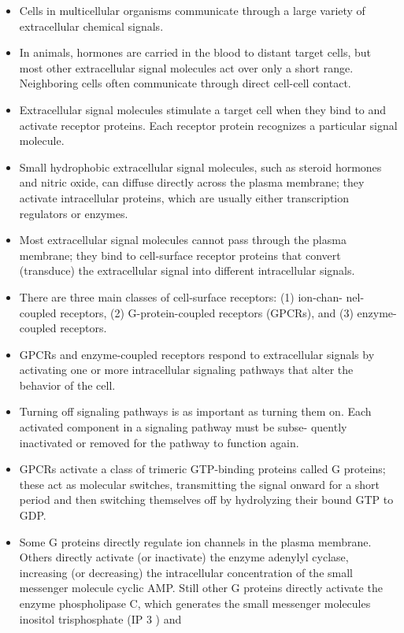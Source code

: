 \begin{itemize}
\item Cells in multicellular organisms communicate through a large variety
of extracellular chemical signals.
\item In animals, hormones are carried in the blood to distant target cells,
but most other extracellular signal molecules act over only a short
range. Neighboring cells often communicate through direct cell-cell
contact.
\item Extracellular signal molecules stimulate a target cell when they bind
to and activate receptor proteins. Each receptor protein recognizes a
particular signal molecule.
\item Small hydrophobic extracellular signal molecules, such as steroid
hormones and nitric oxide, can diffuse directly across the plasma
membrane; they activate intracellular proteins, which are usually
either transcription regulators or enzymes.
\item Most extracellular signal molecules cannot pass through the plasma
membrane; they bind to cell-surface receptor proteins that convert 
(transduce) the extracellular signal into different intracellular
signals.
\item There are three main classes of cell-surface receptors: (1) ion-chan-
nel-coupled receptors, (2) G-protein-coupled receptors (GPCRs), and
(3) enzyme-coupled receptors.
\item GPCRs and enzyme-coupled receptors respond to extracellular signals 
by activating one or more intracellular signaling pathways that
alter the behavior of the cell.
\item Turning off signaling pathways is as important as turning them on.
Each activated component in a signaling pathway must be subse-
quently inactivated or removed for the pathway to function again.
\item GPCRs activate a class of trimeric GTP-binding proteins called G proteins; 
these act as molecular switches, transmitting the signal onward
for a short period and then switching themselves off by hydrolyzing
their bound GTP to GDP.
\item Some G proteins directly regulate ion channels in the plasma membrane. 
Others directly activate (or inactivate) the enzyme adenylyl
cyclase, increasing (or decreasing) the intracellular concentration
of the small messenger molecule cyclic AMP. Still other G proteins
directly activate the enzyme phospholipase C, which generates
the small messenger molecules inositol trisphosphate (IP 3 ) and

\end{itemize}

